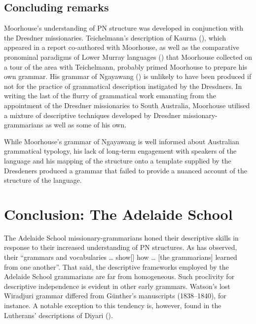 \subsection{Concluding remarks}
\label{sec:key:6.4.2}

Moorhouse’s understanding of PN structure was developed in conjunction with the Dresdner missionaries. Teichelmann’s description of Kaurna (\citeyear{teichelmann_outlines_1840}), which appeared in a report co-authored with Moorhouse, as well as the comparative pronominal paradigms of Lower Murray languages (\citeyear{teichelmann_outlines_1840}) that Moorhouse collected on a tour of the area with Teichelmann, probably primed Moorhouse to prepare his own grammar. His grammar of Ngayawang (\citeyear{moorhouse_vocabulary_1846}) is unlikely to have been produced if not for the practice of grammatical description instigated by the Dresdners. In writing the last of the flurry of grammatical work emanating from the appointment of the Dresdner missionaries to South Australia, Moorhouse utilised a mixture of descriptive techniques developed by Dresdner missionary-grammarians as well as some of his own.

While Moorhouse’s grammar of Ngayawang is well informed about Australian grammatical typology, his lack of long-term engagement with speakers of the language and his mapping of the structure onto a template supplied by the Dresdeners produced a grammar that failed to provide a nuanced account of the structure of the language.

\section{Conclusion: The Adelaide School}
\label{sec:key:6.5}

The Adelaide School missionary-grammarians  honed their descriptive skills in response to their increased understanding of PN structures. As \citet[410]{simpson_notes_1992} has observed, their “grammars and vocabularies … show[] how … [the grammarians] learned from one another”. That said, the descriptive frameworks employed by the Adelaide School grammarians are far from homogeneous. Such proclivity for descriptive independence is evident in other early grammars. Watson’s lost Wiradjuri grammar differed from Günther’s manuscripts (1838--1840), for instance. A notable exception to this tendency is, however, found in the Lutherans' descriptions of Diyari ().

